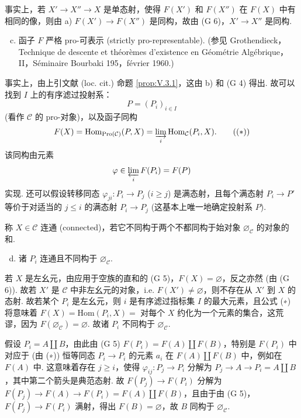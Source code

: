 事实上，若 $X' \to X'' \to X$ 是单态射，使得 $F(X')$ 和 $F(X'')$ 在 $F(X)$ 中有相同的像，则由 a) $F(X') \to F(X'')$ 是同构，故由 (G 6)，$X' \to X''$ 是同构.

\begin{enumerate}[a)]
\setcounter{enumi}{2}
\item 函子 $F$ 严格 pro-可表示 (strictly pro-representable). (参见 Grothendieck，Technique de descente et théorèmes d'existence en Géométrie Algébrique，II，Séminaire Bourbaki 195，février 1960.)
\end{enumerate}

事实上，由上引文献 (loc. cit.) 命题 \ref{prop:V.3.1}，这由 b) 和 (G 4) 得出. 故可以找到 $I$ 上的有序滤过投射系：
\[
P = (P_i)_{i \in I}
\]
(看作 $\mathcal{C}$ 的 pro-对象)，以及函子同构
\begin{equation}
F(X) = \operatorname{Hom}_{\operatorname{Pro}(\mathcal{C})}(P, X) = \varinjlim_{i} \operatorname{Hom}_{\mathcal{C}}(P_i, X). \tag{($*$)}
\end{equation}
该同构由元素
\[
\varphi \in \varprojlim_{i} F(P_i) = F(P)
\]
实现. 还可以假设转移同态 $\varphi_{ji} \colon P_i \to P_j$ ($i \geqslant j$) 是满态射，且每个满态射 $P_i \to P'$ 等价于对适当的 $j \leqslant i$ 的满态射 $P_i \to P_j$ (这基本上唯一地确定投射系 $P$).

称 $X \in \mathcal{C}$ 连通 (connected)，若它不同构于两个不都同构于始对象 $\varnothing_{\mathcal{C}}$ 的对象的和.

\begin{enumerate}[a)]
\setcounter{enumi}{3}
\item 诸 $P_i$ 连通且不同构于 $\varnothing_{\mathcal{C}}$.
\end{enumerate}

若 $X$ 是左幺元，由应用于空族的直和的 (G 5)，$F(X) = \varnothing$，反之亦然 (由 (G 6)). 故若 $X'$ 是 $\mathcal{C}$ 中非左幺元的对象，i.e. $F(X') \neq \varnothing$，则不存在从 $X'$ 到 $X$ 的态射. 故若某个 $P_i$ 是左幺元，则 $i$ 是有序滤过指标集 $I$ 的最大元素，且公式 (∗) 将意味着 $F(X) = \mathrm{Hom}(P_i, X) =$ 对每个 $X$ 约化为一个元素的集合，这荒谬，因为 $F(\varnothing_{\mathcal{C}}) = \varnothing$. 故诸 $P_i$ 不同构于 $\varnothing_{\mathcal{C}}$.

假设 $P_i = A \amalg B$，由此由 (G 5) $F(P_i) = F(A) \amalg F(B)$，特别是 $F(P_i)$ 中对应于 (由 (∗)) 恒等同态 $P_i \to P_i$ 的元素 $a_i$ 在 $F(A) \amalg F(B)$ 中，例如在 $F(A)$ 中. 这意味着存在 $j \geqslant i$，使得 $\varphi_{ij} \colon P_j \to P_i$ 分解为 $P_j \to A \to P_i = A \amalg B$，其中第二个箭头是典范态射. 故 $F(P_j) \to F(P_i)$ 分解为 $F(P_j) \to F(A) \to F(P_i) = F(A) \amalg F(B)$，且由于由 (G 5)，$F(P_j) \longrightarrow F(P_i)$ 满射，得出 $F(B) = \varnothing$，故 $B$ 同构于 $\varnothing_{\mathcal{C}}$.


